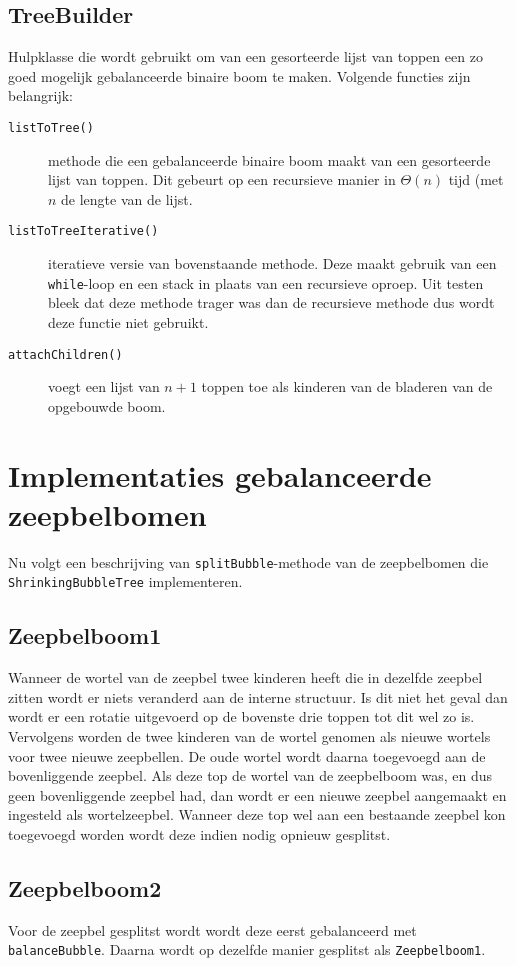 \documentclass[12pt,hidelinks]{article}
\begin{document}
    \subsection{TreeBuilder}
    Hulpklasse die wordt gebruikt om van een gesorteerde lijst van toppen een zo goed mogelijk gebalanceerde binaire boom te maken.
    Volgende functies zijn belangrijk:
    \begin{description}
        \item[\tt listToTree()] methode die een gebalanceerde binaire boom maakt van een gesorteerde lijst van toppen. Dit gebeurt op een recursieve manier in $\Theta(n)$ tijd (met $n$ de lengte van de lijst.
        \item[\tt listToTreeIterative()] iteratieve versie van bovenstaande methode. Deze maakt gebruik van een {\tt while}-loop en een stack in plaats van een recursieve oproep.
            Uit testen bleek dat deze methode trager was dan de recursieve methode dus wordt deze functie niet gebruikt.
        \item[\tt attachChildren()] voegt een lijst van $n+1$ toppen toe als kinderen van de bladeren van de opgebouwde boom.
    \end{description}

    \section{Implementaties gebalanceerde zeepbelbomen} 
    Nu volgt een beschrijving van {\tt splitBubble}-methode van de zeepbelbomen die {\tt ShrinkingBubbleTree} implementeren.
    \subsection{Zeepbelboom1}
    Wanneer de wortel van de zeepbel twee kinderen heeft die in dezelfde zeepbel zitten wordt er niets veranderd aan de interne structuur.
    Is dit niet het geval dan wordt er een rotatie uitgevoerd op de bovenste drie toppen tot dit wel zo is.
    Vervolgens worden de twee kinderen van de wortel genomen als nieuwe wortels voor twee nieuwe zeepbellen.
    De oude wortel wordt daarna toegevoegd aan de bovenliggende zeepbel. 
    Als deze top de wortel van de zeepbelboom was, en dus geen bovenliggende zeepbel had, dan wordt er een nieuwe zeepbel aangemaakt en ingesteld als wortelzeepbel.
    Wanneer deze top wel aan een bestaande zeepbel kon toegevoegd worden wordt deze indien nodig opnieuw gesplitst.
    \subsection{Zeepbelboom2}
    Voor de zeepbel gesplitst wordt wordt deze eerst gebalanceerd met {\tt balanceBubble}. Daarna wordt op dezelfde manier gesplitst als
    {\tt Zeepbelboom1}.
\end{document}
